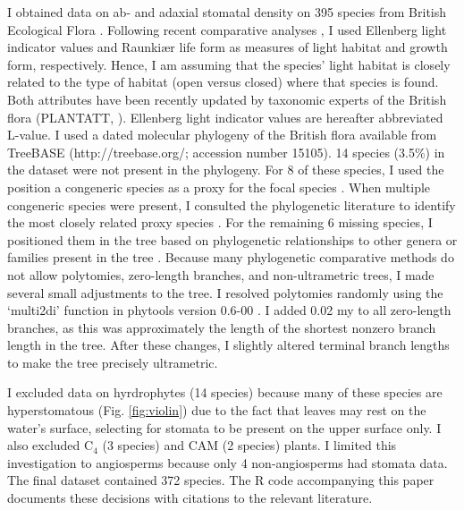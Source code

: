 \documentclass[12pt, oneside]{article}
\newcommand{\pkg}[1]{{\fontseries{b}\selectfont #1}}
\newcommand{\el}{L-value}
\begin{document}
I obtained data on ab- and adaxial stomatal density on 395 species from British Ecological Flora \citep{Salisbury_1927, Fitter_Peat_1994a, BEF}. Following recent comparative analyses \citep[e.g.][]{Bartelheimer_Poschlod_2016, Salguero-Gomez_etal_2016, Shipley_etal_2017}, I used Ellenberg light indicator values \citep{Ellenberg_1974} and Raunki\ae r life form \citep{Raunkiaer_1934} as measures of light habitat and growth form, respectively. Hence, I am assuming that the species' light habitat is closely related to the type of habitat (open versus closed) where that species is found. Both attributes have been recently updated by taxonomic experts of the British flora (PLANTATT, \cite{Hill_etal_2004}). Ellenberg light indicator values are hereafter abbreviated \el. I used a dated molecular phylogeny of the British flora \citep{Lim_etal_2014} available from TreeBASE (http://treebase.org/; accession number 15105). 14 species (3.5\%) in the dataset were not present in the phylogeny. For 8 of these species, I used the position a congeneric species as a proxy for the focal species \citep[following][]{Pennell_etal_2016}. When multiple congeneric species were present, I consulted the phylogenetic literature to identify the most closely related proxy species \citep{Scheen_etal_2004, Salmaki_etal_2013}. For the remaining 6 missing species, I positioned them in the tree based on phylogenetic relationships to other genera or families present in the tree \citep{Fior_etal_2006}. Because many phylogenetic comparative methods do not allow polytomies, zero-length branches, and non-ultrametric trees, I made several small adjustments to the tree. I resolved polytomies randomly using the `multi2di' function in \pkg{phytools} version 0.6-00 \citep{Revell_2012}. I added 0.02 my to all zero-length branches, as this was approximately the length of the shortest nonzero branch length in the tree. After these changes, I slightly altered terminal branch lengths to make the tree precisely ultrametric.

I excluded data on hyrdrophytes (14 species) because many of these species are hyperstomatous (Fig. \ref{fig:violin}) due to the fact that leaves may rest on the water's surface, selecting for stomata to be present on the upper surface only. I also excluded C$_4$ (3 species) and CAM (2 species) plants. I limited this investigation to angiosperms because only 4 non-angiosperms had stomata data. The final dataset contained 372 species. The R code accompanying this paper documents these decisions with citations to the relevant literature.
\end{document}
